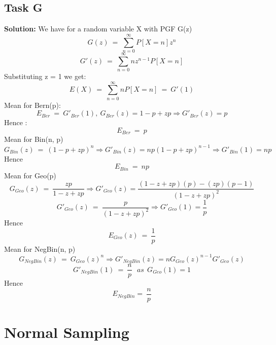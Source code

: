 \documentclass[12pt]{article}
\begin{document}
\subsection{Task G}
\textbf{Solution: } \newline
We have for a random variable X with PGF G(z)
\[G(z)\ =\ \sum_{n=0}^{\infty}P[X=n]z^n\]
\[G'(z)\ =\ \sum_{n=0}^{\infty}nz^{n-1}P[X=n]\]
Substituting z = 1 we get:
\begin{equation}
    E(X)\ =\ \sum_{n=0}^{\infty}nP[X=n]\ =\ G'(1)
\end{equation}
Mean for Bern(p):
\[E_{Ber}\ =\ G'_{Ber}(1),\ G_{Ber}(z)=1-p+zp \Rightarrow G'_{Ber}(z)=p \]
Hence :
\begin{equation}
    E_{Ber}\ =\ p
\end{equation}
Mean for Bin(n, p)
\[G_{Bin}(z)\ =\ (1-p+zp)^n \Rightarrow G'_{Bin}(z)=np(1-p+zp)^{n-1} \Rightarrow G'_{Bin}(1)=np\]
Hence 
\begin{equation}
    E_{Bin}\ =\ np
\end{equation}
Mean for Geo(p)
\[G_{Geo}(z)\ =\ \frac{zp}{1-z+zp} \Rightarrow G'_{Geo}(z)=\frac{(1-z+zp)(p)-(zp)(p-1)}{(1-z+zp)^2}\]
\[G'_{Geo}(z)\ =\ \frac{p}{(1-z+zp)^2} \Rightarrow G'_{Geo}(1)=\frac{1}{p}\]
Hence
\begin{equation}
    E_{Geo}(z)\ =\ \frac{1}{p}
\end{equation}
Mean for NegBin(n, p)
\[G_{NegBin}(z)\ =\ G_{Geo}(z)^{n} \Rightarrow G'_{NegBin}(z)=nG_{Geo}(z)^{n-1}G'_{Geo}(z)\]
\[G'_{NegBin}(1)\ =\ \frac{n}{p}\ \ \ as\ \ G_{Geo}(1)=1\]
Hence 
\begin{equation}
    E_{NegBin} =\ \frac{n}{p}
\end{equation}


\section{Normal Sampling}
\end{document}
